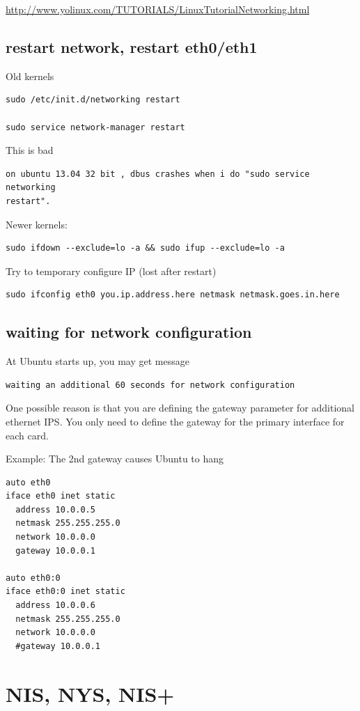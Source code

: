 \url{http://www.yolinux.com/TUTORIALS/LinuxTutorialNetworking.html}

\subsection{restart network, restart eth0/eth1}

Old kernels
\begin{verbatim}
sudo /etc/init.d/networking restart

sudo service network-manager restart
\end{verbatim}
This is bad
\begin{verbatim}
on ubuntu 13.04 32 bit , dbus crashes when i do "sudo service networking
restart".
\end{verbatim}

Newer kernels:
\begin{verbatim}
sudo ifdown --exclude=lo -a && sudo ifup --exclude=lo -a
\end{verbatim}

Try to temporary configure IP (lost after restart)
\begin{verbatim}
sudo ifconfig eth0 you.ip.address.here netmask netmask.goes.in.here
\end{verbatim}


\subsection{waiting for network configuration}

At Ubuntu starts up, you may get message
\begin{verbatim}
waiting an additional 60 seconds for network configuration
\end{verbatim}

One possible reason is that you are defining the gateway parameter for
additional ethernet IPS. You only need to define the gateway for the primary
interface for each card.

Example: The 2nd gateway causes Ubuntu to hang
\begin{verbatim}
auto eth0
iface eth0 inet static
  address 10.0.0.5
  netmask 255.255.255.0
  network 10.0.0.0
  gateway 10.0.0.1

auto eth0:0
iface eth0:0 inet static
  address 10.0.0.6
  netmask 255.255.255.0
  network 10.0.0.0
  #gateway 10.0.0.1
\end{verbatim}

\section{NIS, NYS, NIS+}
\label{sec:NIS_NYS_NIS+}

